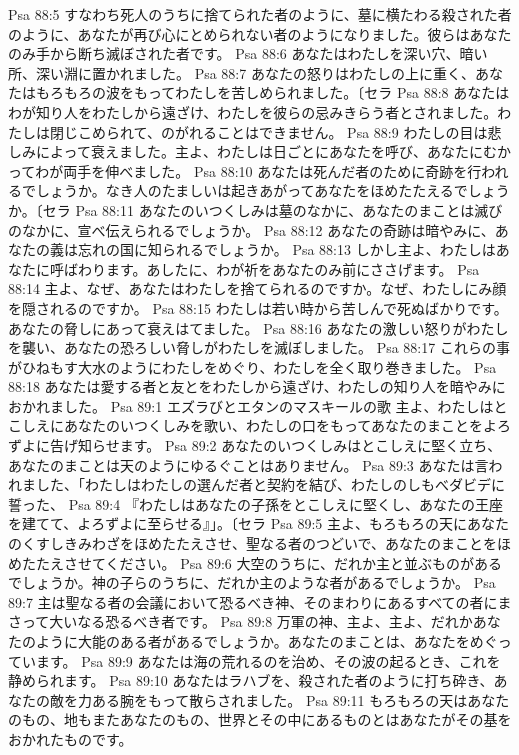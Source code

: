 Psa 88:5  すなわち死人のうちに捨てられた者のように、墓に横たわる殺された者のように、あなたが再び心にとめられない者のようになりました。彼らはあなたのみ手から断ち滅ぼされた者です。
Psa 88:6  あなたはわたしを深い穴、暗い所、深い淵に置かれました。
Psa 88:7  あなたの怒りはわたしの上に重く、あなたはもろもろの波をもってわたしを苦しめられました。〔セラ
Psa 88:8  あなたはわが知り人をわたしから遠ざけ、わたしを彼らの忌みきらう者とされました。わたしは閉じこめられて、のがれることはできません。
Psa 88:9  わたしの目は悲しみによって衰えました。主よ、わたしは日ごとにあなたを呼び、あなたにむかってわが両手を伸べました。
Psa 88:10  あなたは死んだ者のために奇跡を行われるでしょうか。なき人のたましいは起きあがってあなたをほめたたえるでしょうか。〔セラ
Psa 88:11  あなたのいつくしみは墓のなかに、あなたのまことは滅びのなかに、宣べ伝えられるでしょうか。
Psa 88:12  あなたの奇跡は暗やみに、あなたの義は忘れの国に知られるでしょうか。
Psa 88:13  しかし主よ、わたしはあなたに呼ばわります。あしたに、わが祈をあなたのみ前にささげます。
Psa 88:14  主よ、なぜ、あなたはわたしを捨てられるのですか。なぜ、わたしにみ顔を隠されるのですか。
Psa 88:15  わたしは若い時から苦しんで死ぬばかりです。あなたの脅しにあって衰えはてました。
Psa 88:16  あなたの激しい怒りがわたしを襲い、あなたの恐ろしい脅しがわたしを滅ぼしました。
Psa 88:17  これらの事がひねもす大水のようにわたしをめぐり、わたしを全く取り巻きました。
Psa 88:18  あなたは愛する者と友とをわたしから遠ざけ、わたしの知り人を暗やみにおかれました。
Psa 89:1  エズラびとエタンのマスキールの歌 主よ、わたしはとこしえにあなたのいつくしみを歌い、わたしの口をもってあなたのまことをよろずよに告げ知らせます。
Psa 89:2  あなたのいつくしみはとこしえに堅く立ち、あなたのまことは天のようにゆるぐことはありません。
Psa 89:3  あなたは言われました、「わたしはわたしの選んだ者と契約を結び、わたしのしもべダビデに誓った、
Psa 89:4  『わたしはあなたの子孫をとこしえに堅くし、あなたの王座を建てて、よろずよに至らせる』」。〔セラ
Psa 89:5  主よ、もろもろの天にあなたのくすしきみわざをほめたたえさせ、聖なる者のつどいで、あなたのまことをほめたたえさせてください。
Psa 89:6  大空のうちに、だれか主と並ぶものがあるでしょうか。神の子らのうちに、だれか主のような者があるでしょうか。
Psa 89:7  主は聖なる者の会議において恐るべき神、そのまわりにあるすべての者にまさって大いなる恐るべき者です。
Psa 89:8  万軍の神、主よ、主よ、だれかあなたのように大能のある者があるでしょうか。あなたのまことは、あなたをめぐっています。
Psa 89:9  あなたは海の荒れるのを治め、その波の起るとき、これを静められます。
Psa 89:10  あなたはラハブを、殺された者のように打ち砕き、あなたの敵を力ある腕をもって散らされました。
Psa 89:11  もろもろの天はあなたのもの、地もまたあなたのもの、世界とその中にあるものとはあなたがその基をおかれたものです。
